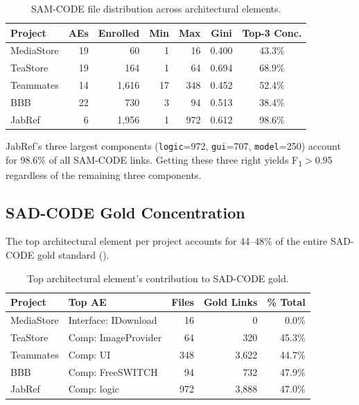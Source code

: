 \documentclass[11pt,a4paper]{report}
\newcommand{\sadcode}{SAD-CODE\xspace}
\newcommand{\samcode}{SAM-CODE\xspace}
\newcommand{\fone}{F\textsubscript{1}\xspace}
\begin{document}
\begin{table}[h]
\caption{\samcode file distribution across architectural elements.}
\label{tab:samcode_skew}
\centering\small
\begin{tabular}{lrrrrcc}
\toprule
\textbf{Project} & \textbf{AEs} & \textbf{Enrolled} & \textbf{Min} & \textbf{Max} & \textbf{Gini} & \textbf{Top-3 Conc.} \\
\midrule
MediaStore  & 19 & 60    & 1   & 16  & 0.400 & 43.3\% \\
TeaStore    & 19 & 164   & 1   & 64  & 0.694 & 68.9\% \\
Teammates   & 14 & 1,616 & 17  & 348 & 0.452 & 52.4\% \\
BBB         & 22 & 730   & 3   & 94  & 0.513 & 38.4\% \\
JabRef      & 6  & 1,956 & 1   & 972 & 0.612 & 98.6\% \\
\bottomrule
\end{tabular}
\end{table}

JabRef's three largest components (\texttt{logic}=972, \texttt{gui}=707,
\texttt{model}=250) account for 98.6\% of all \samcode links. Getting these
three right yields \fone$>$0.95 regardless of the remaining three components.

\subsection{SAD-CODE Gold Concentration}

The top architectural element per project accounts for 44--48\% of the entire
\sadcode gold standard ().

\begin{table}[h]
\caption{Top architectural element's contribution to \sadcode gold.}
\label{tab:sadcode_conc}
\centering\small
\begin{tabular}{llrrr}
\toprule
\textbf{Project} & \textbf{Top AE} & \textbf{Files} & \textbf{Gold Links} & \textbf{\% Total} \\
\midrule
MediaStore  & Interface: IDownload  & 16  & 0     & 0.0\% \\
TeaStore    & Comp: ImageProvider   & 64  & 320   & 45.3\% \\
Teammates   & Comp: UI              & 348 & 3,622 & 44.7\% \\
BBB         & Comp: FreeSWITCH      & 94  & 732   & 47.9\% \\
JabRef      & Comp: logic           & 972 & 3,888 & 47.0\% \\
\bottomrule
\end{tabular}
\end{table}
\end{document}
